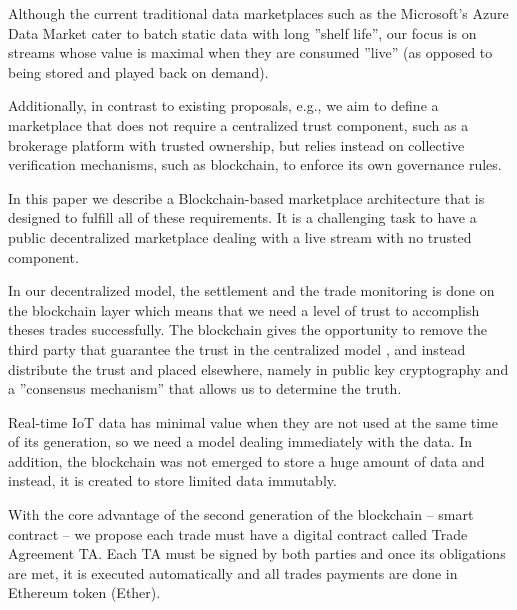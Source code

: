 \documentclass[letterpaper, 10 pt, conference]{ieeeconf}  %
\begin{document}
Although the current traditional data marketplaces such as the Microsoft's Azure Data Market \cite{22} cater to batch static data with long ''shelf life'', our focus is on streams whose value is maximal when they are consumed ''live'' (as opposed to being stored and played back on demand).

Additionally, in contrast to existing proposals, e.g.\cite{Cao:2016:MMR:2926746.2883611}, we aim to define a marketplace that does not require a centralized trust component, such as a brokerage platform with trusted ownership, but relies instead on collective verification mechanisms, such as blockchain, to enforce its own governance rules.

In this paper we describe a Blockchain-based marketplace architecture that is designed to fulfill all of these requirements. It is a challenging task to have a public decentralized marketplace dealing with a live stream with no trusted component.



 In our decentralized model, the settlement and the trade monitoring is done on the blockchain layer which means that we need a level of trust to accomplish theses trades successfully. The blockchain gives the opportunity to remove the third party that guarantee the trust in the centralized model , and instead distribute the trust and placed elsewhere, namely in public key cryptography and a ''consensus mechanism'' that allows us to determine the truth.

Real-time IoT data has minimal value when they are not used at the same time of its generation, so we need a model dealing immediately with the data. In addition, the blockchain was not emerged to store a huge amount of data and instead, it is created to store limited data immutably. 

With the core advantage of the second generation of the blockchain – smart contract – we propose each trade must have a digital contract called Trade Agreement TA. Each TA must be signed by both parties and once its obligations are met, it is executed automatically and all trades payments are done in Ethereum token (Ether).
\end{document}
